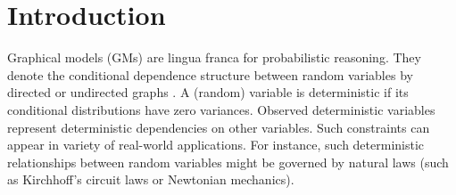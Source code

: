\documentclass[letterpaper]{article}
\begin{document}



\section{Introduction}
\label{sec:intro}
Graphical models (GMs) are lingua franca for probabilistic reasoning.
They denote the conditional dependence structure between random variables by directed or undirected graphs \cite{koller2009probabilistic}. A (random) variable is deterministic if its conditional distributions have zero variances. 
Observed deterministic variables represent deterministic dependencies on other variables.
Such constraints can appear in variety of real-world applications.
For instance, 
such deterministic relationships between random variables might be governed by natural laws 
(such as Kirchhoff's circuit laws or Newtonian mechanics).
\end{document}
